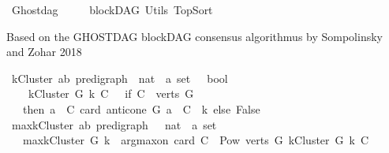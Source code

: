%
\begin{isabellebody}%
%
%
\isadelimtheory
\isanewline
%
\endisadelimtheory
%
\isatagtheory
{}\isamarkupfalse%
\ Ghostdag\ \ \isanewline
\ \ \ blockDAG\ Utils\ TopSort\isanewline
{}%
\endisatagtheory
{\isafoldtheory}%
%
\isadelimtheory
%
\endisadelimtheory
%
\isadelimdocument
%
\endisadelimdocument
%
\isatagdocument
%
\isamarkuptrue%
%
\endisatagdocument
{\isafolddocument}%
%
\isadelimdocument
%
\endisadelimdocument
%
\begin{isamarkuptext}%
Based on the GHOSTDAG blockDAG consensus algorithmus by Sompolinsky and Zohar 2018%
\end{isamarkuptext}\isamarkuptrue%
%
\isadelimdocument
%
\endisadelimdocument
%
\isatagdocument
%
\isamarkuptrue%
%
\endisatagdocument
{\isafolddocument}%
%
\isadelimdocument
%
\endisadelimdocument
{}\isamarkupfalse%
\ kCluster{\isacharcolon}{\kern0pt}{\isacharcolon}{\kern0pt}\ {\isachardoublequoteopen}{\isacharparenleft}{\kern0pt}{\isacharprime}{\kern0pt}a{\isacharcomma}{\kern0pt}{\isacharprime}{\kern0pt}b{\isacharparenright}{\kern0pt}\ pre{\isacharunderscore}{\kern0pt}digraph\ {\isasymRightarrow}\ nat\ {\isasymRightarrow}\ {\isacharprime}{\kern0pt}a\ set\ \ {\isasymRightarrow}\ bool{\isachardoublequoteclose}\isanewline
\ \ \ \ {\isachardoublequoteopen}kCluster\ G\ k\ C\ {\isacharequal}{\kern0pt}\ \ {\isacharparenleft}{\kern0pt}if\ {\isacharparenleft}{\kern0pt}C\ {\isasymsubseteq}\ {\isacharparenleft}{\kern0pt}verts\ G{\isacharparenright}{\kern0pt}{\isacharparenright}{\kern0pt}\isanewline
\ \ \ then\ {\isacharparenleft}{\kern0pt}{\isasymforall}a\ {\isasymin}\ C{\isachardot}{\kern0pt}\ card\ {\isacharparenleft}{\kern0pt}{\isacharparenleft}{\kern0pt}anticone\ G\ a{\isacharparenright}{\kern0pt}\ {\isasyminter}\ C{\isacharparenright}{\kern0pt}\ {\isasymle}\ k{\isacharparenright}{\kern0pt}\ else\ False{\isacharparenright}{\kern0pt}{\isachardoublequoteclose}\isanewline
\isanewline
{}\isamarkupfalse%
\ max{\isacharunderscore}{\kern0pt}kCluster{\isacharcolon}{\kern0pt}{\isacharcolon}{\kern0pt}\ {\isachardoublequoteopen}{\isacharparenleft}{\kern0pt}{\isacharprime}{\kern0pt}a{\isacharcomma}{\kern0pt}{\isacharprime}{\kern0pt}b{\isacharparenright}{\kern0pt}\ pre{\isacharunderscore}{\kern0pt}digraph\ \ {\isasymRightarrow}\ nat\ {\isasymRightarrow}\ {\isacharprime}{\kern0pt}a\ set{\isachardoublequoteclose}\isanewline
\ \ \ {\isachardoublequoteopen}max{\isacharunderscore}{\kern0pt}kCluster\ G\ k\ {\isacharequal}{\kern0pt}\ arg{\isacharunderscore}{\kern0pt}max{\isacharunderscore}{\kern0pt}on\ card\ {\isacharbraceleft}{\kern0pt}C\ {\isasymin}\ {\isacharparenleft}{\kern0pt}Pow\ {\isacharparenleft}{\kern0pt}verts\ G{\isacharparenright}{\kern0pt}{\isacharparenright}{\kern0pt}{\isachardot}{\kern0pt}\ kCluster\ G\ k\ C{\isacharbraceright}{\kern0pt}{\isachardoublequoteclose}\isanewline

\end{isabellebody}
